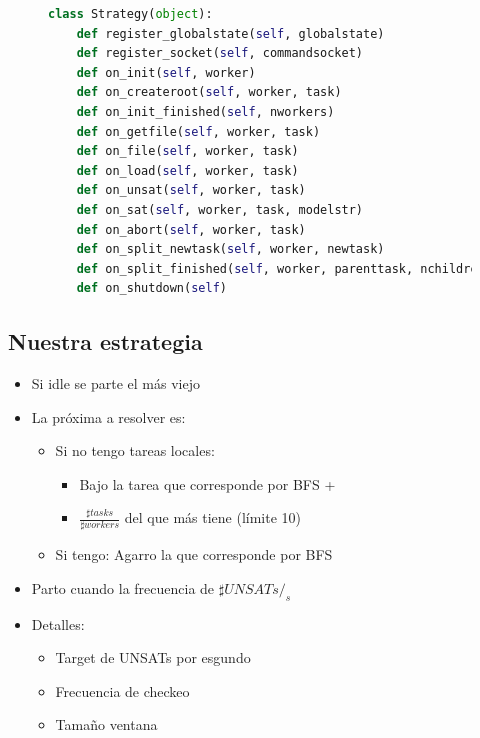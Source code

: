 \begin{figure}
\begin{tiny}
\begin{lstlisting}[language=Python,caption=Interfaz Strategy]
class Strategy(object):
	def register_globalstate(self, globalstate)
	def register_socket(self, commandsocket)
	def on_init(self, worker)
	def on_createroot(self, worker, task)
	def on_init_finished(self, nworkers)
	def on_getfile(self, worker, task)
	def on_file(self, worker, task)
	def on_load(self, worker, task)
	def on_unsat(self, worker, task)
	def on_sat(self, worker, task, modelstr)
	def on_abort(self, worker, task)
	def on_split_newtask(self, worker, newtask)
	def on_split_finished(self, worker, parenttask, nchildren)
	def on_shutdown(self)
\end{lstlisting}
\end{tiny}
\end{figure}

\subsection{Nuestra estrategia}

\begin{itemize}
	\item Si idle se parte el más viejo
	\item La próxima a resolver es:
		\begin{itemize}
			\item Si no tengo tareas locales:
				\begin{itemize}
					\item Bajo la tarea que corresponde por BFS +
					\item $\frac{\sharp tasks}{\sharp workers}$ del que más tiene (límite 10)
				\end{itemize}
			\item Si tengo: Agarro la que corresponde por BFS
		\end{itemize}
	\item Parto cuando la frecuencia de $\sharp UNSATs/_s$
	\item Detalles:
	\begin{itemize}
		\item Target de UNSATs por esgundo
		\item Frecuencia de checkeo
		\item Tamaño ventana
	\end{itemize}
\end{itemize}

